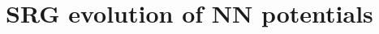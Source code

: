 \documentclass[preprintnumbers,floatfix,aps,prc,preprint,nofootinbib]{revtex4-1}
\begin{document}


\section{SRG evolution of NN potentials}
\label{sec:srg_evolution_nn_potentials}


%
%
%
	
\end{document}
